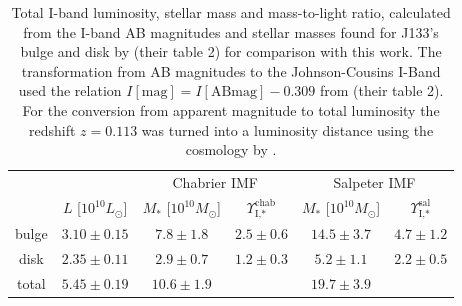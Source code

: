 \begin{table}
\centering
\begin{tabular}{cccccc}
\hline\hline
& & \multicolumn{2}{c}{Chabrier IMF} & \multicolumn{2}{c}{Salpeter IMF}\\
      &  $L$ [$10^{10}L_{\odot}$]                & $M_*$ [$10^{10}M_\odot$]               & $\Upsilon_\text{I,*}^\text{chab}$ & $M_*$ [$10^{10}M_\odot$] & $\Upsilon_\text{I,*}^\text{sal}$ \\\hline
bulge &   $3.10 \pm 0.15 $  & $7.8 \pm 1.8$ & $2.5 \pm 0.6$ & $14.5 \pm 3.7 $ & $4.7 \pm 1.2$ \\
disk  &   $2.35 \pm 0.11 $  & $2.9 \pm 0.7$ & $1.2 \pm 0.3$ & $5.2 \pm 1.1$ & $2.2 \pm 0.5$ \\
total &   $5.45 \pm 0.19$ & $10.6 \pm 1.9$& & $19.7 \pm 3.9$&\\\hline
\end{tabular}
\caption{Total I-band luminosity, stellar mass and mass-to-light ratio, calculated from the I-band AB magnitudes and stellar masses found for J133's bulge and disk by \citet{SWELLSI} (their table 2) for comparison with this work. The transformation from AB magnitudes to the Johnson-Cousins I-Band used the relation $I[\text{mag}] = I[\text{ABmag}] - 0.309$ from \citet{FG1994} (their table 2). For the conversion from apparent magnitude to total luminosity the redshift $z=0.113$ \citet{SWELLSIII} was turned into a luminosity distance using the cosmology by \citet{WMAP5cosm}. }
\label{tab:previousresults}
\end{table}